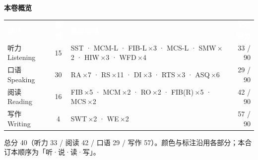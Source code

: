 \documentclass[11pt]{article}
\begin{document}


\clearpage
\tableofcontents
\bigskip

{\large\bfseries\color{cAccent}本卷概览}\par\smallskip
{\small
\begin{tabularx}{\linewidth}{@{}l c >{\RaggedRight\arraybackslash}X r@{}}
\rowcolor{cHead}\textcolor{white}{\bfseries 部分} & \textcolor{white}{\bfseries 题量} & \textcolor{white}{\bfseries 题型构成} & \textcolor{white}{\bfseries 本项得分}\\
听力 Listening & 15 & SST · MCM-L · FIB-L\,$\times$3 · MCS-L · SMW\,$\times$2 · HIW\,$\times$3 · WFD\,$\times$4 & 33 / 90\\
口语 Speaking & 30 & RA\,$\times$7 · RS\,$\times$11 · DI\,$\times$3 · RTS\,$\times$3 · ASQ\,$\times$6 & 29 / 90\\
阅读 Reading & 16 & FIB\,$\times$5 · MCM\,$\times$2 · RO\,$\times$2 · FIB(R)\,$\times$5 · MCS\,$\times$2 & 42 / 90\\
写作 Writing & \phantom{0}4 & SWT\,$\times$2 · WE\,$\times$2 & 57 / 90\\
\end{tabularx}}
\par\smallskip
{\footnotesize\color{gray}总分 40（听力 33 / 阅读 42 / 口语 29 / 写作 57）。颜色与标注沿用各部分；本合订本顺序为「听·说·读·写」。}

\clearpage

\clearpage

\clearpage

\clearpage

\end{document}
